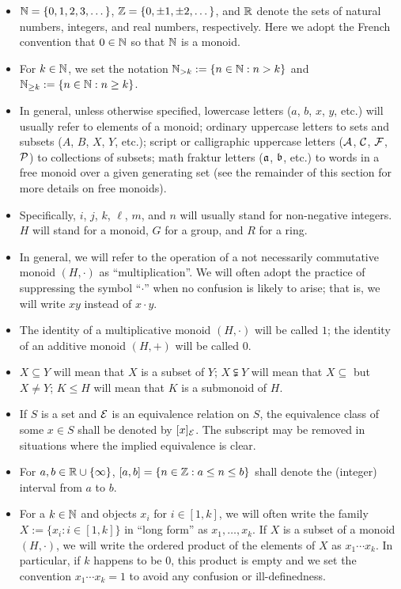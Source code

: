 \begin{itemize}
	\item $\NN = \{0,1,2,3,\dots\}$, $\ZZ = \{0,\pm 1, \pm 2,\dots\}$, and $\RR$ denote the sets of natural numbers, integers, and real numbers, respectively.
	Here we adopt the French convention that $0\in \NN$ so that $\NN$ is a monoid.
	\item For $k\in \NN$, we set the notation $\NN_{>k} := \{n\in \NN: n>k\}$ and $\NN_{\ge k} := \{n\in \NN: n\ge k\}$.
	\item In general, unless otherwise specified, lowercase letters ($a$, $b$, $x$, $y$, etc.) will usually refer to elements of a monoid; ordinary uppercase letters to sets and subsets ($A$, $B$, $X$, $Y$, etc.); script or calligraphic uppercase letters ($\A$, $\C$, $\F$, $\P$) to collections of subsets; math fraktur letters ($\aa$, $\bb$, etc.) to words in a free monoid over a given generating set (see the remainder of this section for more details on free monoids).
	\item Specifically, $i$, $j$, $k$, $\ell$, $m$, and $n$ will usually stand for non-negative integers. 
	$H$ will stand for a monoid, $G$ for a group, and $R$ for a ring.
	\item In general, we will refer to the operation of a not necessarily commutative monoid $(H,\cdot)$ as ``multiplication''.
	We will often adopt the practice of suppressing the symbol ``$\cdot$'' when no confusion is likely to arise; that is, we will write $xy$ instead of $x\cdot y$.
	\item The identity of a multiplicative monoid $(H,\cdot)$ will be called $1$; the identity of an additive monoid $(H,+)$ will be called $0$.
	\item $X\subseteq Y$ will mean that $X$ is a subset of $Y$; $X\subsetneqq Y$ will mean that $X\subseteq$ but $X\neq Y$; $K\le H$ will mean that $K$ is a submonoid of $H$.
	\item If $S$ is a set and $\E$ is an equivalence relation on $S$, the equivalence class of some $x\in S$ shall be denoted by $[x]_\E$.
	The subscript may be removed in situations where the implied equivalence is clear.
	\item For $a, b\in \RR\cup\{\infty\}$, $[ a,b ] = \{ n\in \ZZ : a \le n \le b \}$ shall denote the (integer) interval from $a$ to $b$.
	\item For a $k\in \NN$ and objects $x_i$ for $i\in [1,k]$, we will often write the family $X:=\{x_i: i\in [1,k]\}$ in ``long form'' as $x_1,\dots,x_k$.
	If $X$ is a subset of a monoid $(H,\cdot)$, we will write the ordered product of the elements of $X$ as $x_1\cdots x_k$.
	In particular, if $k$ happens to be $0$, this product is empty and we set the convention $x_1\cdots x_k = 1$ to avoid any confusion or ill-definedness.
\end{itemize}




